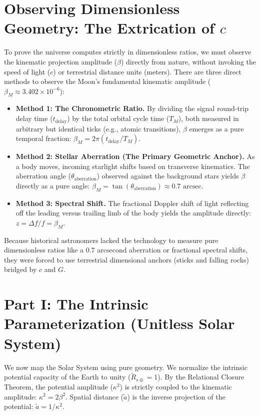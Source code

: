 \documentclass[11pt, a4paper]{article}
\begin{document}
\section{Observing Dimensionless Geometry: The Extrication of $c$}
To prove the universe computes strictly in dimensionless ratios, we must observe the kinematic projection amplitude ($\beta$) directly from nature, without invoking the speed of light ($c$) or terrestrial distance units (meters). There are three direct methods to observe the Moon's fundamental kinematic amplitude ($\beta_M \approx 3.402 \times 10^{-6}$):

\begin{itemize}
    \item \textbf{Method 1: The Chronometric Ratio.} By dividing the signal round-trip delay time ($t_{\text{delay}}$) by the total orbital cycle time ($T_M$), both measured in arbitrary but identical ticks (e.g., atomic transitions), $\beta$ emerges as a pure temporal fraction: $\beta_M = 2\pi (t_{\text{delay}} / T_M)$.
    \item \textbf{Method 2: Stellar Aberration (The Primary Geometric Anchor).} As a body moves, incoming starlight shifts based on transverse kinematics. The aberration angle ($\theta_{\text{aberration}}$) observed against the background stars yields $\beta$ directly as a pure angle: $\beta_M = \tan(\theta_{\text{aberration}}) \approx 0.7 \text{ arcsec}$.
    \item \textbf{Method 3: Spectral Shift.} The fractional Doppler shift of light reflecting off the leading versus trailing limb of the body yields the amplitude directly: $z = \Delta f / f = \beta_M$.
\end{itemize}
Because historical astronomers lacked the technology to measure pure dimensionless ratios like a $0.7$ arcsecond aberration or fractional spectral shifts, they were forced to use terrestrial dimensional anchors (sticks and falling rocks) bridged by $c$ and $G$.

\section{Part I: The Intrinsic Parameterization (Unitless Solar System)}
We now map the Solar System using pure geometry. We normalize the intrinsic potential capacity of the Earth to unity ($\tilde{R}_{s\oplus} = 1$). By the Relational Closure Theorem, the potential amplitude ($\kappa^2$) is strictly coupled to the kinematic amplitude: $\kappa^2 = 2\beta^2$. Spatial distance ($\tilde{a}$) is the inverse projection of the potential: $\tilde{a} = 1 / \kappa^2$.
\end{document}
